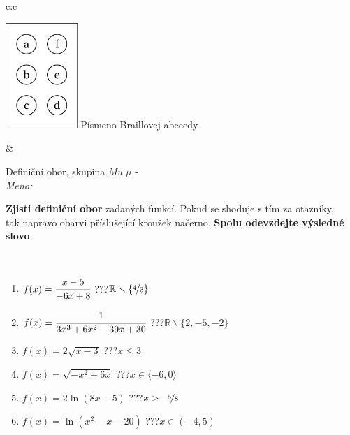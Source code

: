 \documentclass[10pt]{report}
\begin{document}
\begin{tabular}{c:c}
\begin{minipage}[c][104.5mm][t]{0.5\linewidth}
\begin{center}
\begin{minipage}{0.20\linewidth}
\begin{center}
\includegraphics[height=40mm]{../images/braille.png}
{\small Písmeno Braillovej abecedy}
\end{center}
\end{minipage}
\end{center}
\end{minipage}
&
\begin{minipage}[c][104.5mm][t]{0.5\linewidth}
\begin{center}
\vspace{7mm}
{\huge Definiční obor, skupina \textit{Mu $\mu$} -}\\[5mm]
\textit{Meno:}\phantom{xxxxxxxxxxxxxxxxxxxxxxxxxxxxxxxxxxxxxxxxxxxxxxxxxxxxxxxxxxxxxxxxx}\\[5mm]
\begin{minipage}{0.95\linewidth}
\textbf{Zjisti definiční obor} zadaných funkcí. Pokud se shoduje s tím za otazníky,\\tak napravo obarvi příslušející kroužek načerno. \textbf{Spolu odevzdejte výsledné slovo}.
\end{minipage}
\\[1mm]
\begin{minipage}{0.79\linewidth}
\begin{center}
\begin{varwidth}{\linewidth}
\begin{enumerate}
\normalsizerrr
\item $f(x)=\cfrac{x-5}{-6x+8}$\quad \dotfill\; ???\;\dotfill \quad $\mathbb{R}\smallsetminus\{\nicefrac{4}{3}\}$
\item $f(x)=\cfrac{1}{3x^3+6x^2-39x+30}$\quad \dotfill\; ???\;\dotfill \quad $\mathbb{R}\smallsetminus\{2,-5,-2\}$
\item $f(x)=2\sqrt{x-3}$\quad \dotfill\; ???\;\dotfill \quad $x\leq3$
\item $f(x)=\sqrt{-x^2+6x}$\quad \dotfill\; ???\;\dotfill \quad $x\in\langle-6 , 0\rangle$
\item $f(x)=2\ln{(8x-5)}$\quad \dotfill\; ???\;\dotfill \quad $x>\nicefrac{-5}{8}$
\item $f(x)=\ln{(x^2-x-20)}$\quad \dotfill\; ???\;\dotfill \quad $x\in(-4 , 5)$

\end{enumerate}
\end{varwidth}
\end{center}
\end{minipage}
\end{center}
\end{minipage}
\end{tabular}
\end{document}
